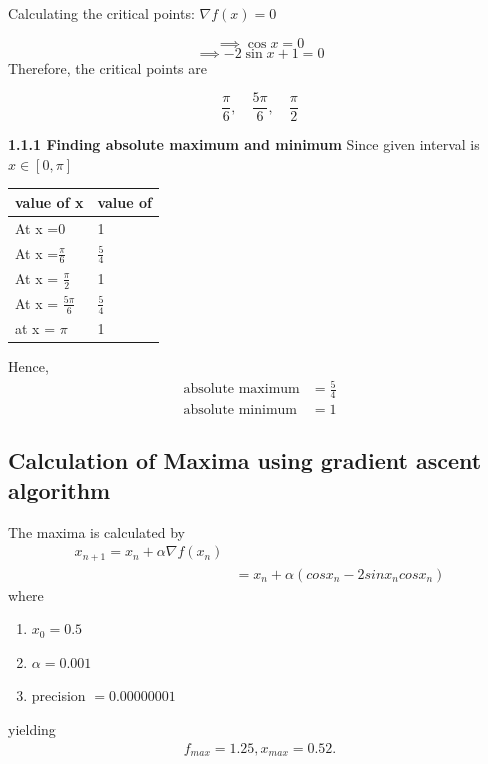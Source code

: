 \documentclass[10pt,twocolumn]{article}
\providecommand{\brak}[1]{\ensuremath{\left(#1\right)}}
\begin{document}
{\noindent Calculating the critical points:
$ \nabla f(x) = 0 $

\begin{equation}
\implies \cos{x} = 0 
\end{equation}
\begin{equation}
\implies -2\sin{x} + 1 = 0
\end{equation}
Therefore, the critical points are 

\begin{equation}
\frac{\pi}{6},\quad\frac{5\pi}{6},\quad\frac{\pi}{2}
\end{equation}

\textbf{1.1.1 Finding absolute maximum and minimum} 
Since given interval is $x \in [0,\pi]$ 

\begin{table}[h]
\centering
\large
\begin{tabular}{|l|l|}
\hline
\textbf{value of x} & \textbf{value of} \\ \hline
At x =0             & 1                 \\ \hline
At x =$ \frac{\pi}{6}$            & $\frac{5}{4}$            \\ \hline
At x =  $ \frac{\pi}{2}$            & 1                 \\ \hline
At x =  $ \frac{5\pi}{6}$            & $\frac{5}{4}$             \\ \hline
at x =       $\pi$       & 1                 \\ \hline
\end{tabular}
\end{table}

Hence, 
\begin{align}
\text{absolute maximum} & =  \frac{5}{4}\\
\text{absolute minimum} & = 1
\end{align}

\subsection{Calculation of Maxima using gradient ascent algorithm}
\fi
The 
maxima is calculated by
\begin{align}
x_{n+1} = x_n + \alpha \nabla f(x_n) 
\\
 &= x_n + \alpha \brak{cosx_n-2sinx_ncosx_n}
\end{align}
where 
\begin{enumerate}
	\item $x_0=0.5$ 
	\item $\alpha=0.001$ 
	\item precision $= 0.00000001$ 
\end{enumerate}
yielding
    \begin{align}
	    f_{max} = 1.25, 
 x_{max}        = 0.52.
    \end{align}
    \iffalse
    
}
\end{document}
